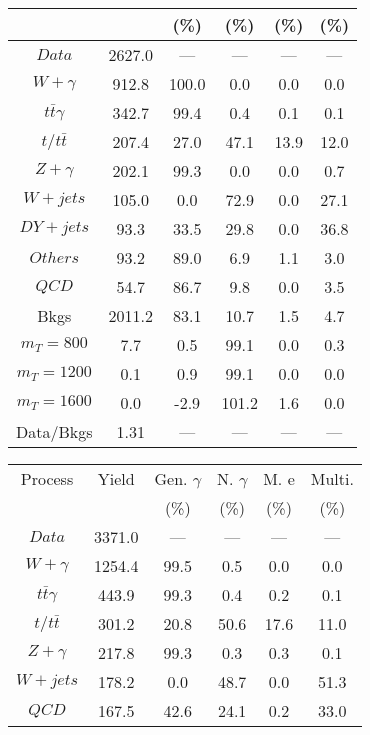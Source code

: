 \begin{figure}
\begin{minipage}[c]{0.32\textwidth}
{\begin{tabular}{cccccc}
 &  & (\%) & (\%) & (\%) & (\%)  \\
\hline
                                                                      $ Data $ &  2627.0 &  --- &  --- &  --- &  ---\\
$ W+\gamma $ &  912.8 &  100.0 &  0.0 &  0.0 &  0.0\\
$ t\bar{t}\gamma $ &  342.7 &  99.4 &  0.4 &  0.1 &  0.1\\
$ t/t\bar{t} $ &  207.4 &  27.0 &  47.1 &  13.9 &  12.0\\
$ Z+\gamma $ &  202.1 &  99.3 &  0.0 &  0.0 &  0.7\\
$ W+jets $ &  105.0 &  0.0 &  72.9 &  0.0 &  27.1\\
$ DY+jets $ &  93.3 &  33.5 &  29.8 &  0.0 &  36.8\\
$ Others $ &  93.2 &  89.0 &  6.9 &  1.1 &  3.0\\
$ QCD $ &  54.7 &  86.7 &  9.8 &  0.0 &  3.5\\
Bkgs &  2011.2 &  83.1 &  10.7 &  1.5 &  4.7\\
$ m_{T} = 800 $ &  7.7 &  0.5 &  99.1 &  0.0 &  0.3\\
$ m_{T} = 1200 $ &  0.1 &  0.9 &  99.1 &  0.0 &  0.0\\
$ m_{T} = 1600 $ &  0.0 &  -2.9 &  101.2 &  1.6 &  0.0\\
Data/Bkgs &  1.31 &  --- &  --- &  --- &  ---\\
\hline
\end{tabular}
}
\end{minipage}
\begin{minipage}[c]{0.32\textwidth}
\centering
\tiny{
\begin{tabular}{cccccc}
\hline
Process & Yield & Gen. $\gamma$ & N. $\gamma$ & M. e & Multi. \\
 &  & (\%) & (\%) & (\%) & (\%)  \\
\hline
                                                                      $ Data $ &  3371.0 &  --- &  --- &  --- &  ---\\
$ W+\gamma $ &  1254.4 &  99.5 &  0.5 &  0.0 &  0.0\\
$ t\bar{t}\gamma $ &  443.9 &  99.3 &  0.4 &  0.2 &  0.1\\
$ t/t\bar{t} $ &  301.2 &  20.8 &  50.6 &  17.6 &  11.0\\
$ Z+\gamma $ &  217.8 &  99.3 &  0.3 &  0.3 &  0.1\\
$ W+jets $ &  178.2 &  0.0 &  48.7 &  0.0 &  51.3\\
$ QCD $ &  167.5 &  42.6 &  24.1 &  0.2 &  33.0\\

\end{tabular}}
\end{minipage}
\end{figure}
